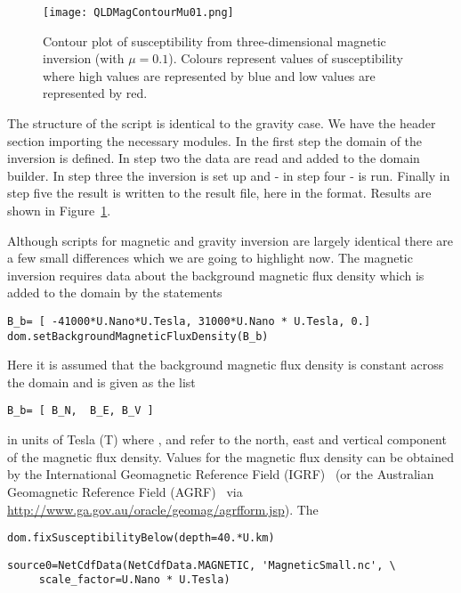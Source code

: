 \begin{figure}
\centering
\texttt{[image: QLDMagContourMu01.png]}
\caption{Contour plot of susceptibility from three-dimensional magnetic inversion (with $\mu=0.1$).
Colours represent values of susceptibility where high values are represented by
    blue and low values are represented by red.}
\label{FIG:P1:MAG:1}
\end{figure}


The structure of the script is identical to the gravity case. We have the header section importing the necessary modules. In the first step
the domain of the inversion is defined. In step two the data are read and added to the domain builder. In step three the inversion is 
set up and - in step four - is run. Finally in step five the result is written to the result file, here  in the \VTK format.
Results are shown in Figure~\ref{FIG:P1:MAG:1}.

Although scripts for magnetic and gravity inversion are largely identical there are a few small differences which we are
going to highlight now. The magnetic inversion requires data about the background  magnetic flux density which is added to the domain
by the statements 
\begin{verbatim}
B_b= [ -41000*U.Nano*U.Tesla, 31000*U.Nano * U.Tesla, 0.]
dom.setBackgroundMagneticFluxDensity(B_b)
\end{verbatim}
Here it is assumed that the background magnetic flux density is constant across the domain and is given as the list
\begin{verbatim}
B_b= [ B_N,  B_E, B_V ]
\end{verbatim}
in units of Tesla (T) where 
,  and  refer to 
the north, east and vertical component of the magnetic flux density.
Values for the magnetic flux density can be obtained by the International
Geomagnetic Reference Field (IGRF)~\cite{IGRF} 
(or the Australian Geomagnetic Reference Field (AGRF)~\cite{AGRF} via \url{http://www.ga.gov.au/oracle/geomag/agrfform.jsp}).
The 



\begin{verbatim}
dom.fixSusceptibilityBelow(depth=40.*U.km)
\end{verbatim}

\begin{verbatim}
source0=NetCdfData(NetCdfData.MAGNETIC, 'MagneticSmall.nc', \
     scale_factor=U.Nano * U.Tesla)
\end{verbatim}

